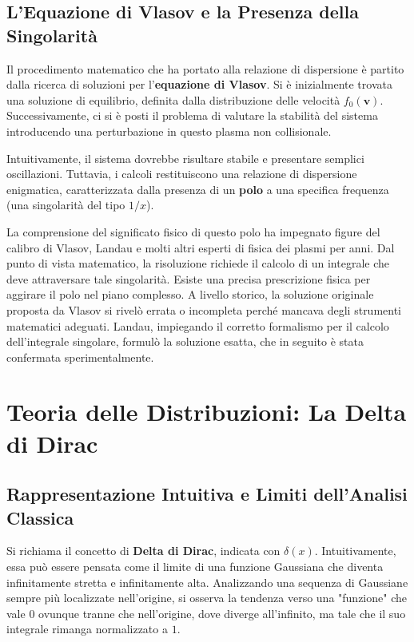 \subsection{L'Equazione di Vlasov e la Presenza della Singolarità}
Il procedimento matematico che ha portato alla relazione di dispersione è partito dalla ricerca di soluzioni per l'\textbf{equazione di Vlasov}. Si è inizialmente trovata una soluzione di equilibrio, definita dalla distribuzione delle velocità $f_0(\mathbf{v})$. Successivamente, ci si è posti il problema di valutare la stabilità del sistema introducendo una perturbazione in questo plasma non collisionale.

Intuitivamente, il sistema dovrebbe risultare stabile e presentare semplici oscillazioni. Tuttavia, i calcoli restituiscono una relazione di dispersione enigmatica, caratterizzata dalla presenza di un \textbf{polo} a una specifica frequenza (una singolarità del tipo $1/x$).

La comprensione del significato fisico di questo polo ha impegnato figure del calibro di Vlasov, Landau e molti altri esperti di fisica dei plasmi per anni.
Dal punto di vista matematico, la risoluzione richiede il calcolo di un integrale che deve attraversare tale singolarità. Esiste una precisa prescrizione fisica per aggirare il polo nel piano complesso.
A livello storico, la soluzione originale proposta da Vlasov si rivelò errata o incompleta perché mancava degli strumenti matematici adeguati. Landau, impiegando il corretto formalismo per il calcolo dell'integrale singolare, formulò la soluzione esatta, che in seguito è stata confermata sperimentalmente.

\section{Teoria delle Distribuzioni: La Delta di Dirac}

\subsection{Rappresentazione Intuitiva e Limiti dell'Analisi Classica}
Si richiama il concetto di \textbf{Delta di Dirac}, indicata con $\delta(x)$. Intuitivamente, essa può essere pensata come il limite di una funzione Gaussiana che diventa infinitamente stretta e infinitamente alta.
Analizzando una sequenza di Gaussiane sempre più localizzate nell'origine, si osserva la tendenza verso una "funzione" che vale $0$ ovunque tranne che nell'origine, dove diverge all'infinito, ma tale che il suo integrale rimanga normalizzato a $1$.

